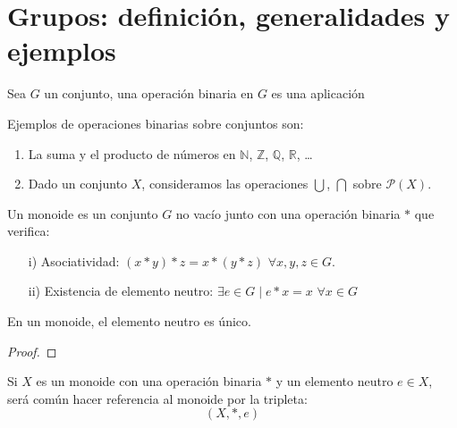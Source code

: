 \chapter{Grupos: definición, generalidades y ejemplos}

\begin{definicion}
    Sea $G$ un conjunto, una operación binaria en $G$ es una aplicación
\end{definicion}

\begin{ejemplo}
    Ejemplos de operaciones binarias sobre conjuntos son:
    \begin{enumerate}
        \item La suma y el producto de números en $\mathbb{N}$, $\mathbb{Z}$, $\mathbb{Q}$, $\mathbb{R}$, \ldots
        \item Dado un conjunto $X$, consideramos las operaciones $\bigcup$, $\bigcap$ sobre $\mathcal{P}(X)$.
    \end{enumerate}
\end{ejemplo}

\begin{definicion}[Monoide]
    Un monoide es un conjunto $G$ no vacío junto con una operación binaria $\ast$ que verifica:
    \begin{enumerate}
        \item[i)] Asociatividad: $(x\ast y)\ast z = x\ast (y\ast z)$ $\forall x,y,z\in G$.
        \item[ii)] Existencia de elemento neutro: $\exists e\in G \mid e\ast x = x$ $\forall x\in G$
    \end{enumerate}
\end{definicion}

\begin{observacion}
    En un monoide, el elemento neutro es único.
    \begin{proof}
    \end{proof}
\end{observacion}

\begin{notacion}
    Si $X$ es un monoide con una operación binaria $\ast$ y un elemento neutro $e\in X$, será común hacer referencia al monoide por la tripleta:
    \begin{equation*}
        (X,\ast,e)
    \end{equation*}
\end{notacion}

